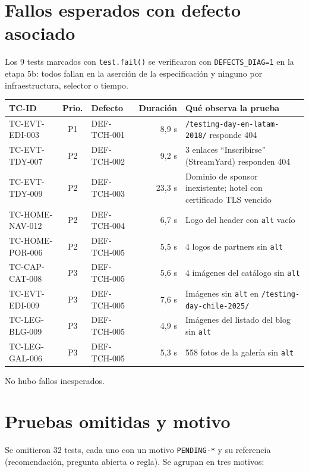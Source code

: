 \documentclass[11pt,a4paper]{article}
\newcommand{\code}[1]{\texttt{#1}}
\begin{document}
\section{Fallos esperados con defecto asociado}

Los 9 tests marcados con \code{test.fail()} se verificaron con \code{DEFECTS\_DIAG=1} en la etapa 5b: todos fallan en la aserción de la especificación y ninguno por infraestructura, selector o tiempo.

\begin{center}\small
\begin{tabularx}{\textwidth}{@{}l c l r Y@{}}
\toprule
TC-ID & Prio. & Defecto & Duración & Qué observa la prueba \\
\midrule
TC-EVT-EDI-003 & P1 & DEF-TCH-001 & 8,9 s & \code{/testing-day-en-latam-2018/} responde 404 \\
TC-EVT-TDY-007 & P2 & DEF-TCH-002 & 9,2 s & 3 enlaces ``Inscribirse'' (StreamYard) responden 404 \\
TC-EVT-TDY-009 & P2 & DEF-TCH-003 & 23,3 s & Dominio de sponsor inexistente; hotel con certificado TLS vencido \\
TC-HOME-NAV-012 & P2 & DEF-TCH-004 & 6,7 s & Logo del header con \code{alt} vacío \\
TC-HOME-POR-006 & P2 & DEF-TCH-005 & 5,5 s & 4 logos de partners sin \code{alt} \\
TC-CAP-CAT-008 & P3 & DEF-TCH-005 & 5,6 s & 4 imágenes del catálogo sin \code{alt} \\
TC-EVT-EDI-009 & P3 & DEF-TCH-005 & 7,6 s & Imágenes sin \code{alt} en \code{/testing-day-chile-2025/} \\
TC-LEG-BLG-009 & P3 & DEF-TCH-005 & 4,9 s & Imágenes del listado del blog sin \code{alt} \\
TC-LEG-GAL-006 & P3 & DEF-TCH-005 & 5,3 s & 558 fotos de la galería sin \code{alt} \\
\bottomrule
\end{tabularx}
\end{center}

No hubo fallos inesperados.

\section{Pruebas omitidas y motivo}

Se omitieron 32 tests, cada uno con un motivo \code{PENDING-*} y su referencia (recomendación, pregunta abierta o regla). Se agrupan en tres motivos:
\end{document}
